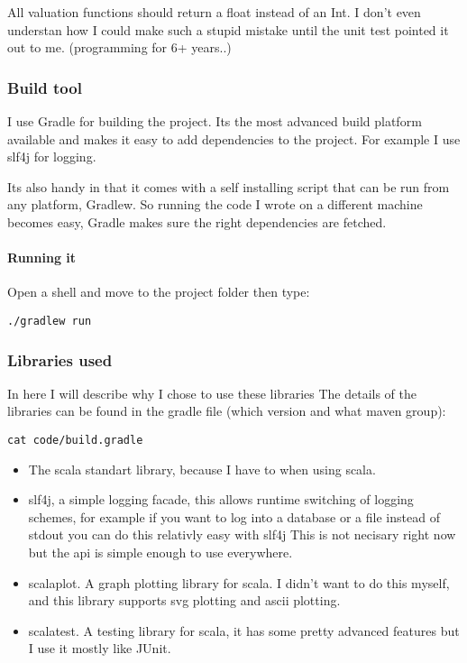 \documentclass{article}
\begin{document}
\begin{empfile}
All valuation functions should return a float instead of an Int.
I don't even understan how I could make such a stupid mistake until the
unit test pointed it out to me. (programming for 6+ years..)

\subsubsection{Build tool}
I use Gradle for building the project. Its the most advanced build platform
available and makes it easy to add dependencies to the project.
For example I use slf4j for logging.

Its also handy in that it comes with a self installing script that can be run
from any platform, Gradlew. So running the code I wrote on a different machine
becomes easy, Gradle makes sure the right dependencies are fetched.

\paragraph{Running it}

Open a shell and move to the project folder then type:

\lstset{language=Bash}
\begin{lstlisting}[frame=single]
	./gradlew run
\end{lstlisting}

\subsubsection{Libraries used}
In here I will describe why I chose to use these libraries
The details of the libraries can be found in the gradle file (which
version and what maven group):

\begin{lstlisting}[frame=single]
	cat code/build.gradle
\end{lstlisting}


\begin{itemize}
	\item The scala standart library, because I have to when using scala.
	\item slf4j, a simple logging facade, this allows runtime switching of
		logging schemes, for example if you want to log into a database or
		a file instead of stdout you can do this relativly easy with slf4j
		This is not necisary right now but the api is simple enough to use
		everywhere.
	\item scalaplot. A graph plotting library for scala. I didn't want to
		do this myself, and this library supports svg plotting and ascii
		plotting.
	\item scalatest. A testing library for scala, it has some pretty advanced
		features but I use it mostly like JUnit.
\end{itemize}

\end{empfile}
\end{document}
